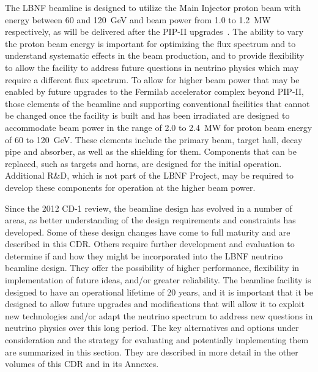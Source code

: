 The LBNF beamline is designed to utilize the Main Injector proton beam with energy between 60 and 120~GeV and beam power from 1.0 to 1.2~MW respectively, as will be delivered after the PIP-II upgrades~\cite{pip2-2013}.  
The ability to vary the 
proton beam energy is important for optimizing the flux spectrum and to understand systematic effects in the beam production, and to provide flexibility to allow the facility to address future questions in neutrino physics which may require a 
different flux spectrum.  To allow for higher beam power that may be enabled by future upgrades to the Fermilab accelerator complex beyond PIP-II, those elements of the beamline and supporting conventional facilities that cannot be changed once 
the facility is built and has been irradiated are designed to accommodate beam power in the range of 2.0 to 2.4~MW for proton beam energy of 60 to 120~GeV.  These elements include the primary beam, target hall, decay pipe and absorber, as 
well as the shielding for them.  Components that can be replaced, such as targets and horns, are designed for the  initial operation.  %
Additional R\&D, which is not part of the LBNF Project, %
may be required to develop these components %
for operation at the higher beam power. 
 
Since the 2012 CD-1 review, the beamline design has evolved in a number of areas, as better understanding of the design requirements and constraints has developed.  Some of these design changes have come to full maturity and are 
described in this CDR.  Others require further development and evaluation to determine if and how they might be incorporated into the LBNF neutrino beamline design.  They offer the possibility of higher performance, flexibility in 
implementation of future ideas, and/or greater reliability.  The beamline facility is designed to have an operational lifetime of 20 years, and it is important that it be designed to allow future upgrades and modifications that will allow it to 
exploit new 
technologies and/or adapt the neutrino spectrum to address new questions in neutrino physics over this long period. The key alternatives and options under consideration and the strategy for evaluating and potentially implementing them are summarized in this section.  They are described in more detail in the other volumes of this CDR and in its Annexes.  
               
